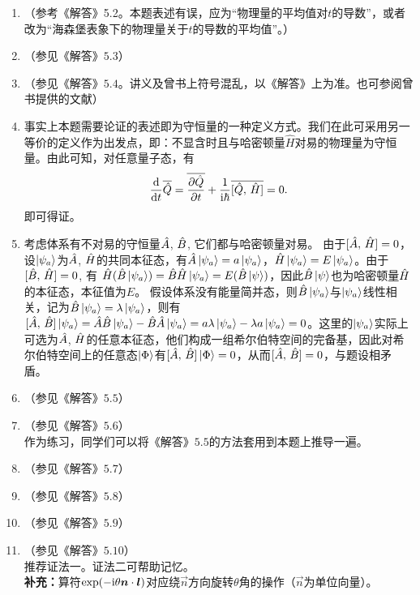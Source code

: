 \begin{enumerate}[label=\textbf{3.\arabic*}, leftmargin=-0.5mm]
\item（参考《解答》5.2。本题表述有误，应为“物理量的平均值对$t$的导数”，或者改为“海森堡表象下的物理量关于$t$的导数的平均值”。）


\item
（参见《解答》$5.3$）

\item
（参见《解答》$5.4$。讲义及曾书上符号混乱，以《解答》上为准。也可参阅曾书提供的文献\cite{14}）

\item 事实上本题需要论证的表述即为守恒量的一种定义方式。我们在此可采用另一等价的定义作为出发点，即：不显含时且与哈密顿量$\hat{H}$对易的物理量为守恒量。由此可知，对任意量子态，有
\[\dv{t} \overline{\hat{Q}} = \overline{\pdv{\hat{Q}}{t}} + \frac{1}{\mathrm{i}\hbar}\overline{[\hat{Q},\,\hat{H}]} = 0.\]
即可得证。

\item 考虑体系有不对易的守恒量$\hat{A}$, $\hat{B}$, 它们都与哈密顿量对易。
由于$[\hat{A},\,\hat{H}]=0$，设$\ket{\psi_a}$为$\hat{A}$, $\hat{H}$的共同本征态，有$\hat{A}\ket{\psi_a}=a\ket{\psi_a}$，$\hat{H}\ket{\psi_a} = E\ket{\psi_a}$。由于$[\hat{B},\,\hat{H}]=0$, 有
$\hat{H}(\hat{B}\ket{\psi_a})=\hat{B}\hat{H}\ket{\psi_a} = E(\hat{B}\ket{\psi})$，因此$\hat{B}\ket{\psi}$也为哈密顿量$\hat{H}$的本征态，本征值为$E$。 假设体系没有能量简并态，则$\hat{B}\ket{\psi_a}$与$\ket{\psi_a}$线性相关，记为$\hat{B}\ket{\psi_a}=\lambda\ket{\psi_a}$，则有$[\hat{A},\,\hat{B}]\ket{\psi_a} = \hat{A}\hat{B}\ket{\psi_a}-\hat{B}\hat{A}\ket{\psi_a} = a \lambda \ket{\psi_a}-\lambda a \ket{\psi_a} = 0$。这里的$\ket{\psi_a}$实际上可选为$\hat{A}$, $\hat{H}$的任意本征态，他们构成一组希尔伯特空间的完备基，因此对希尔伯特空间上的任意态$\ket{\Phi}$有$[\hat{A},\,\hat{B}]\ket{\Phi}=0$，从而$[\hat{A},\,\hat{B}]=0$，与题设相矛盾。

\item
（参见《解答》$5.5$）

\item
（参见《解答》$5.6$）\\
作为练习，同学们可以将《解答》$5.5$的方法套用到本题上推导一遍。

\item
（参见《解答》$5.7$）

\item
（参见《解答》$5.8$）

\item
（参见《解答》$5.9$）

\item
（参见《解答》$5.10$）\\
推荐证法一。证法二可帮助记忆。\\
\textbf{补充：}算符$\exp(-\mathrm{i}\theta\boldsymbol{n}\cdot\boldsymbol{l})$对应绕$\vec{n}$方向旋转$\theta$角的操作（$\vec{n}$为单位向量）。


\end{enumerate}
